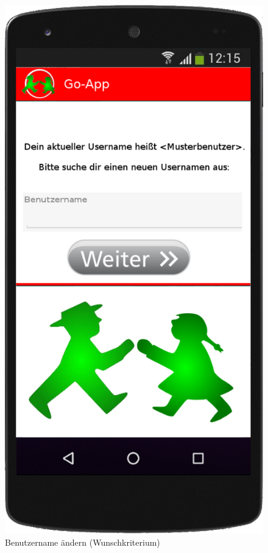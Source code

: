 \begin{figure}
	\caption{Benutzername ändern (Wunschkriterium)}
		\includegraphics[scale =0.2]{resources/images/handy/username_aendern.png}
\end{figure}

